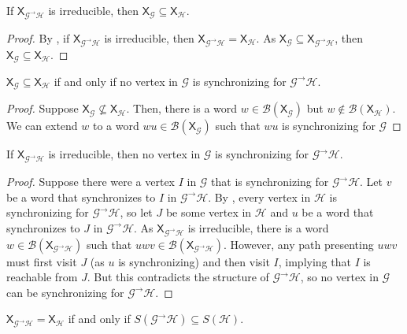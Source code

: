 \documentclass[hidelinks]{article}
\newcommand{\Gc}{\mathcal{G}}  %
\newcommand{\Hc}{\mathcal{H}}  %
\newcommand{\Bc}{\mathcal{B}}
\newcommand{\GtH}{{\Gc^\to\Hc}}
\newcommand{\shift}[1]{\mathsf{X}_{#1}}
\theoremstyle{definition}
\begin{document}
\begin{corollary}
    If \(\shift{\GtH}\) is irreducible, then \(\shift{\Gc} \subseteq \shift{\Hc}\).
\end{corollary}

\begin{proof}
    By , if \(\shift{\GtH}\) is irreducible, then \(\shift{\GtH} = \shift{\Hc}\).
    As \(\shift{\Gc} \subseteq \shift{\GtH}\), then \(\shift{\Gc} \subseteq \shift{\Hc}\).
\end{proof}

\begin{theorem}
    \(\shift{\Gc} \subseteq \shift{\Hc}\) if and only if no vertex in \(\Gc\) is synchronizing for 
    \(\GtH\).
\end{theorem}

\begin{proof}
    Suppose \(\shift{\Gc} \nsubseteq \shift{\Hc}\). Then, there is a word \(w \in \Bc(\shift{\Gc})\) 
    but \(w \notin \Bc(\shift{\Hc})\). We can extend \(w\) to a word \(wu \in \Bc(\shift{\Gc})\) such 
    that \(wu\) is synchronizing for \(\Gc\)
\end{proof}

\begin{corollary}
    
\end{corollary}

\begin{theorem}\label{nogsync}
    If \(\shift{\GtH}\) is irreducible, then no vertex in \(\Gc\) is synchronizing for \(\GtH\).
\end{theorem}

\begin{proof}
    Suppose there were a vertex \(I\) in \(\Gc\) that is synchronizing for \(\GtH\). 
    Let \(v\) be a word that synchronizes to \(I\) in \(\GtH\). By , every vertex in \(\Hc\) 
    is synchronizing for \(\GtH\), so let \(J\) be some vertex in \(\Hc\) and \(u\) be a word that synchronizes to 
    \(J\) in \(\GtH\). As \(\shift{\GtH}\) is irreducible, there is a word \(w \in \Bc(\shift{\GtH})\) 
    such that \(uwv \in \Bc(\shift{\GtH})\). However, any path presenting \(uwv\) must first visit 
    \(J\) (as \(u\) is synchronizing) and then visit \(I\), implying that \(I\) is reachable 
    from \(J\). But this contradicts the structure of \(\GtH\), so no vertex in \(\Gc\) can be 
    synchronizing for \(\GtH\).
\end{proof}

\begin{theorem}
    \(\shift{\GtH} = \shift{\Hc}\) if and only if \(S(\GtH) \subseteq S(\Hc)\).
\end{theorem}
\end{document}
